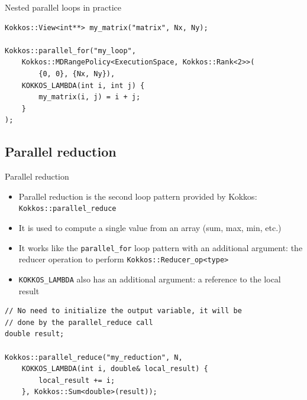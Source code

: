 \documentclass[aspectratio=169]{beamer}
\begin{document}
\begin{frame}[fragile]{Nested parallel loops in practice}
    \begin{verbatim}
Kokkos::View<int**> my_matrix("matrix", Nx, Ny);

Kokkos::parallel_for("my_loop",
    Kokkos::MDRangePolicy<ExecutionSpace, Kokkos::Rank<2>>(
        {0, 0}, {Nx, Ny}),
    KOKKOS_LAMBDA(int i, int j) {
        my_matrix(i, j) = i + j;
    }
);
    \end{verbatim}
\end{frame}


\subsection[Parallel reduction]{Parallel reduction}


\begin{frame}[fragile]{Parallel reduction}
    \begin{itemize}
        \item Parallel reduction is the second loop pattern provided by Kokkos: \texttt{Kokkos::parallel\_reduce}
        \item It is used to compute a single value from an array (sum, max, min, etc.)
        \item It works like the \texttt{parallel\_for} loop pattern with an additional argument: the reducer operation to perform \texttt{Kokkos::Reducer\_op<type>}
        \item \texttt{KOKKOS\_LAMBDA} also has an additional argument: a reference to the local result
    \end{itemize}
    \begin{verbatim}
// No need to initialize the output variable, it will be
// done by the parallel_reduce call
double result;

Kokkos::parallel_reduce("my_reduction", N,
    KOKKOS_LAMBDA(int i, double& local_result) {
        local_result += i;
    }, Kokkos::Sum<double>(result));
    \end{verbatim}
\end{frame}

\end{document}
